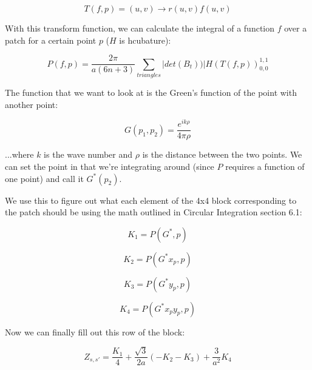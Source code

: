 \documentclass[etd,twoside,senior]{BYUPhys}
\begin{document}
\begin{equation}
  T\left(f,p\right)=\left(u,v\right)\rightarrow r\left(u,v\right)f\left(u,v\right)
\end{equation}

With this transform function, we can calculate the integral of a function
$f$ over a patch for a certain point $p$ ($H$ is hcubature):

\begin{equation}
  P\left(f,p\right)=\frac{2\pi}{a\left(6n+3\right)}\sum_{triangles}|det\left(B_{t}\right))|H\left(T\left(f,p\right)\right)_{0,0}^{1,1}
\end{equation}

The function that we want to look at is the Green's function of the
point with another point:

\begin{equation} \label{eq:greens}
  G\left(p_{1},p_{2}\right)=\frac{e^{ik\rho}}{4\pi\rho}
\end{equation}

...where $k$ is the wave number and $\rho$ is the distance between
the two points. We can set the point in that we're integrating around
(since $P$ requires a function of one point) and call it $G^{*}\left(p_{2}\right)$.

We use this to figure out what each element of the 4x4 block corresponding
to the patch should be using the math outlined in Circular Integration
section 6.1:

\begin{equation}
  K_{1}=P\left(G^{*},p\right)
\end{equation}

\begin{equation}
  K_{2}=P\left(G^{*}x_{p},p\right)
\end{equation}

\begin{equation}
  K_{3}=P\left(G^{*}y_{p},p\right)
\end{equation}

\begin{equation}
  K_{4}=P\left(G^{*}x_{p}y_{p},p\right)
\end{equation}

Now we can finally fill out this row of the block:

\begin{equation}
  Z_{s,s'}=\frac{K_{1}}{4}+\frac{\sqrt{3}}{2a}\left(-K_{2}-K_{3}\right)+\frac{3}{a^{2}}K_{4}
\end{equation}
\end{document}
